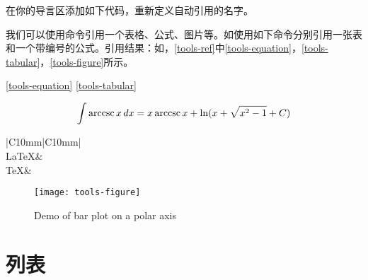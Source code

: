 在你的导言区添加如下代码，重新定义自动引用的名字。
\begin{latex}
\end{latex}

我们可以使用命令引用一个表格、公式、图片等。如使用如下命令分别引用一张表和一个带编号的公式。引用结果：如，\autoref{tools-ref}中\autoref{tools-equation}，\autoref{tools-tabular}，\autoref{tools-figure}所示。

\begin{latex}
\ref{tools-equation}
\ref{tools-tabular}
\end{latex}

\begin{equation}\label{tools-equation}
\int \operatorname{arccsc} x\,dx=x \operatorname{arccsc} x+\ln(x+\sqrt{x^2-1}+C)
\end{equation}

\begin{table}[!ht]
\begin{center}
	\caption{\TeX 家族标识符}
	\label{tools-tabular}
	\begin{tabular}{|C{10mm}|C{10mm}|}
		\hline
		\\
		\hline
		\LaTeX & \LaTeXe\\
		\hline
		\TeX & \XeLaTeX\\
		\hline
	\end{tabular}
\end{center}
\end{table}

\begin{figure}[!ht]
	\begin{center}
		\texttt{[image: tools-figure]}
		\caption{Demo of bar plot on a polar axis}
		\label{tools-figure}
	\end{center}
\end{figure}



\section{列表}
